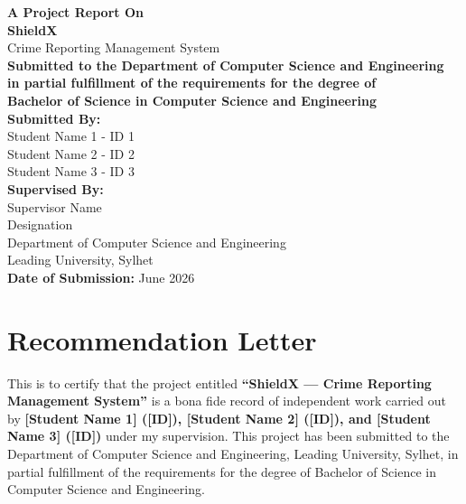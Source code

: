 \documentclass[11pt, a4paper]{report}
\begin{document}
\begin{titlepage}
    \begin{center}
        \vspace*{2cm}
        
        \textbf{\LARGE A Project Report On}\\[1cm]
        
        {\Huge\bfseries ShieldX}\\[0.3cm]
        {\Large Crime Reporting Management System}\\[2cm]
        
        \textbf{\large Submitted to the Department of Computer Science and Engineering}\\
        \textbf{\large in partial fulfillment of the requirements for the degree of}\\
        \textbf{\large Bachelor of Science in Computer Science and Engineering}\\[2.5cm]
        
        \textbf{\large Submitted By:}\\[0.5cm]
        \large
        Student Name 1 - ID 1\\
        Student Name 2 - ID 2\\
        Student Name 3 - ID 3\\[2.5cm]
        
        \textbf{\large Supervised By:}\\[0.5cm]
        \large
        Supervisor Name\\
        Designation\\
        Department of Computer Science and Engineering\\
        Leading University, Sylhet\\[2.5cm]
        
        \textbf{\large Date of Submission:} June 2026
        
    \end{center}
\end{titlepage}


\chapter*{Recommendation Letter}
This is to certify that the project entitled \textbf{``ShieldX --- Crime Reporting Management System''} is a bona fide record of independent work carried out by \textbf{[Student Name 1] ([ID]), [Student Name 2] ([ID]), and [Student Name 3] ([ID])} under my supervision. This project has been submitted to the Department of Computer Science and Engineering, Leading University, Sylhet, in partial fulfillment of the requirements for the degree of Bachelor of Science in Computer Science and Engineering. 
\end{document}
